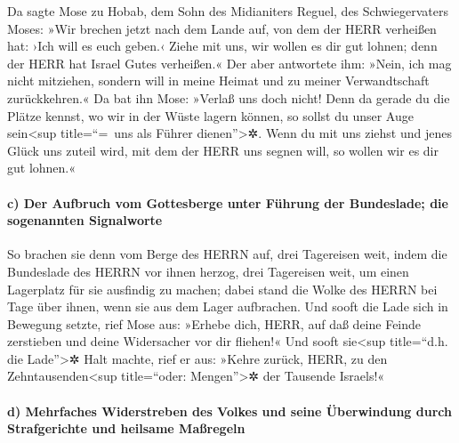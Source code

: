 Da sagte Mose zu Hobab, dem Sohn des Midianiters Reguel,
des Schwiegervaters Moses: »Wir brechen jetzt nach dem Lande auf, von
dem der HERR verheißen hat: ›Ich will es euch geben.‹ Ziehe mit uns, wir
wollen es dir gut lohnen; denn der HERR hat Israel Gutes verheißen.«
Der aber antwortete ihm: »Nein, ich mag nicht mitziehen,
sondern will in meine Heimat und zu meiner Verwandtschaft zurückkehren.«
Da bat ihn Mose: »Verlaß uns doch nicht! Denn da gerade
du die Plätze kennst, wo wir in der Wüste lagern können, so sollst du
unser Auge sein\textless sup title=``=~uns als Führer
dienen''\textgreater✲. Wenn du mit uns ziehst und jenes
Glück uns zuteil wird, mit dem der HERR uns segnen will, so wollen wir
es dir gut lohnen.«

\hypertarget{c-der-aufbruch-vom-gottesberge-unter-fuxfchrung-der-bundeslade-die-sogenannten-signalworte}{%
\paragraph{c) Der Aufbruch vom Gottesberge unter Führung der Bundeslade;
die sogenannten
Signalworte}\label{c-der-aufbruch-vom-gottesberge-unter-fuxfchrung-der-bundeslade-die-sogenannten-signalworte}}

So brachen sie denn vom Berge des HERRN auf, drei
Tagereisen weit, indem die Bundeslade des HERRN vor ihnen herzog, drei
Tagereisen weit, um einen Lagerplatz für sie ausfindig zu machen;
dabei stand die Wolke des HERRN bei Tage über ihnen, wenn
sie aus dem Lager aufbrachen. Und sooft die Lade sich in
Bewegung setzte, rief Mose aus: »Erhebe dich, HERR, auf daß deine Feinde
zerstieben und deine Widersacher vor dir fliehen!« Und
sooft sie\textless sup title=``d.h. die Lade''\textgreater✲ Halt machte,
rief er aus: »Kehre zurück, HERR, zu den Zehntausenden\textless sup
title=``oder: Mengen''\textgreater✲ der Tausende Israels!«

\hypertarget{d-mehrfaches-widerstreben-des-volkes-und-seine-uxfcberwindung-durch-strafgerichte-und-heilsame-mauxdfregeln}{%
\paragraph{d) Mehrfaches Widerstreben des Volkes und seine Überwindung
durch Strafgerichte und heilsame
Maßregeln}\label{d-mehrfaches-widerstreben-des-volkes-und-seine-uxfcberwindung-durch-strafgerichte-und-heilsame-mauxdfregeln}}

